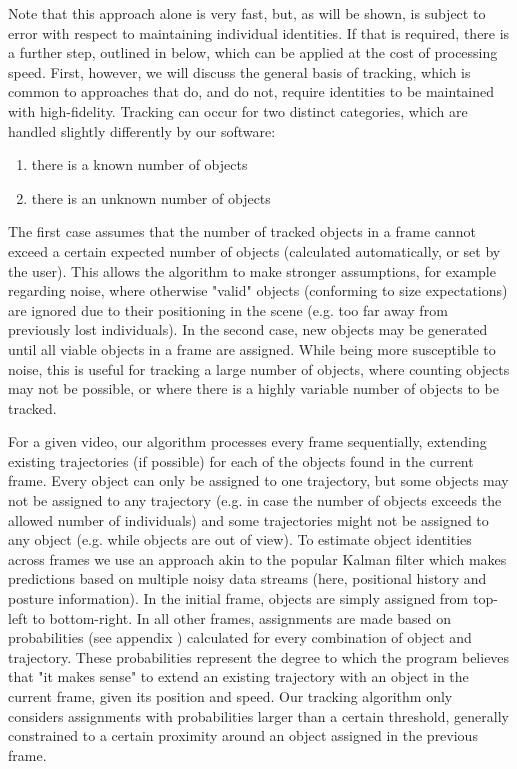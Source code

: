 \documentclass[9pt,lineno]{elife}
\begin{document}
Note that this approach alone is very fast, but, as will be shown, is subject to error with respect to maintaining individual identities. If that is required, there is a further step, outlined in  below, which can be applied at the cost of processing speed. First, however, we will discuss the general basis of tracking, which is common to approaches that do, and do not, require identities to be maintained with high-fidelity. Tracking can occur for two distinct categories, which are handled slightly differently by our software:
\begin{enumerate}
	\item there is a known number of objects
	\item there is an unknown number of objects
\end{enumerate}

The first case assumes that the number of tracked objects in a frame cannot exceed a certain expected number of objects ({\color{blue}calculated} automatically{\color{blue},} or set by the user). This allows the algorithm to make stronger assumptions, for example regarding noise, where otherwise "valid" objects (conforming to size expectations) are ignored due to their positioning in the scene (e.g. too far away from previously lost individuals). In the second case, new objects may be generated until all viable objects in a frame are assigned. While being more susceptible to noise, this is useful for tracking a large number of objects, where counting objects may not be possible, or where there is a highly variable number of objects to be tracked.

For a given video, our algorithm processes every frame sequentially, extending existing trajectories (if possible) for each of the objects found in the current frame. Every object can only be assigned to one trajectory, but some objects may not be assigned to any trajectory (e.g. in case the number of objects exceeds the allowed number of individuals) and some trajectories might not be assigned to any object (e.g. while objects are out of view). To estimate object identities across frames we use an approach akin to the popular Kalman filter \citep{kalman1960new} which makes predictions based on multiple noisy data streams (here, positional history and posture information).  
In the initial frame, objects are simply assigned from top-left to bottom-right. In all other frames, assignments are made based on probabilities (see appendix ) calculated for every combination of object and trajectory. These probabilities represent the degree to which the program believes that "it makes sense" to extend an existing trajectory with an object in the current frame, given its position and speed. Our tracking algorithm only considers assignments with probabilities larger than a certain threshold, generally constrained to a certain proximity around an object assigned in the previous frame. 
\end{document}
